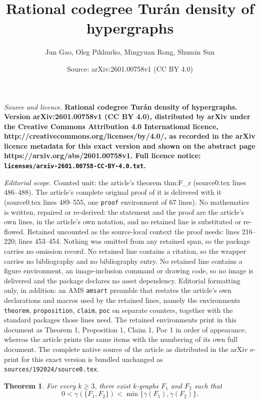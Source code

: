 \documentclass[10pt,a4paper]{amsart}
\title{\bf\Large Rational codegree Tur\'an density of hypergraphs}
\author{Jun Gao, Oleg Pikhurko, Mingyuan Rong, Shumin Sun}
\date{Source: arXiv:2601.00758v1 (CC BY 4.0)}
\newtheorem{theorem}{Theorem}
\begin{document}
\maketitle

\noindent\emph{Source and licence.} \bf\Large Rational codegree Tur\'an density of hypergraphs. Version arXiv:2601.00758v1 (CC BY 4.0), distributed by arXiv under the Creative Commons Attribution 4.0 International licence, http://creativecommons.org/licenses/by/4.0/, as recorded in the arXiv licence metadata for this exact version and shown on the abstract page https://arxiv.org/abs/2601.00758v1. Full licence notice: \texttt{licenses/arxiv-2601.00758-CC-BY-4.0.txt}.\par\smallskip

\noindent\textit{Editorial scope.} Counted unit: the article's theorem thm:F\_r (source0.tex lines 486--488). The article's complete original proof of it is delivered with it (source0.tex lines 489--555, one \texttt{proof} environment of 67 lines). No mathematics is written, repaired or re-derived: the statement and the proof are the article's own lines, in the article's own notation, and no retained line is substituted or re-flowed.  Retained uncounted as the source-local context the proof needs: lines 216--220; lines 453--454.  Nothing was omitted from any retained span, so the package carries no omission record.  No retained line contains a citation, so the wrapper carries no bibliography and no bibliography entry.  No retained line contains a figure environment, an image-inclusion command or drawing code, so no image is delivered and the package declares no asset dependency.  Editorial formatting only, in addition: an AMS \texttt{amsart} preamble that restates the article's own declarations and macros used by the retained lines, namely the environments \texttt{theorem}, \texttt{proposition}, \texttt{claim}, \texttt{poc} on separate counters, together with the standard packages those lines need.  The retained environments print in this document as Theorem 1, Proposition 1, Claim 1, Poc 1 in order of appearance, whereas the article prints the same items with the numbering of its own full document.  The complete native source of the article as distributed in the arXiv e-print for this exact version is bundled unchanged as \texttt{sources/192024/source0.tex}.
 \begin{theorem}\label{thm:non-principal}
  For every $k\ge 3$, there exist $k$-graphs $F_1$ and $F_2$ such that
     \[0<\gamma(\{F_1, F_2\})<\min\{\gamma(F_1),\gamma(F_2)\}.
     \]
 \end{theorem}
\end{document}
